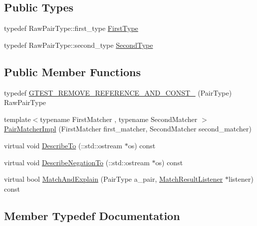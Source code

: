 \subsection*{Public Types}
\begin{DoxyCompactItemize}
\item 
typedef Raw\+Pair\+Type\+::first\+\_\+type \hyperlink{classtesting_1_1internal_1_1PairMatcherImpl_a9de66d76f0ebb0f107a9c18903b03176}{First\+Type}
\item 
typedef Raw\+Pair\+Type\+::second\+\_\+type \hyperlink{classtesting_1_1internal_1_1PairMatcherImpl_ad63c9ff4f1aff81562efca293ff5aca9}{Second\+Type}
\end{DoxyCompactItemize}
\subsection*{Public Member Functions}
\begin{DoxyCompactItemize}
\item 
typedef \hyperlink{classtesting_1_1internal_1_1PairMatcherImpl_aa035224a7b73b2af1d1d27226a479241}{G\+T\+E\+S\+T\+\_\+\+R\+E\+M\+O\+V\+E\+\_\+\+R\+E\+F\+E\+R\+E\+N\+C\+E\+\_\+\+A\+N\+D\+\_\+\+C\+O\+N\+S\+T\+\_\+} (Pair\+Type) Raw\+Pair\+Type
\item 
{\footnotesize template$<$typename First\+Matcher , typename Second\+Matcher $>$ }\\\hyperlink{classtesting_1_1internal_1_1PairMatcherImpl_ae2615e785df46255c8695a5972ca510a}{Pair\+Matcher\+Impl} (First\+Matcher first\+\_\+matcher, Second\+Matcher second\+\_\+matcher)
\item 
virtual void \hyperlink{classtesting_1_1internal_1_1PairMatcherImpl_a901ef35fe2284f9c0decf41af8143dd2}{Describe\+To} (\+::std\+::ostream $\ast$os) const 
\item 
virtual void \hyperlink{classtesting_1_1internal_1_1PairMatcherImpl_a922aa4076ef4e2f1a2d2b4ae30d8be7c}{Describe\+Negation\+To} (\+::std\+::ostream $\ast$os) const 
\item 
virtual bool \hyperlink{classtesting_1_1internal_1_1PairMatcherImpl_a691add64a7dd061451722cdf95a6eba2}{Match\+And\+Explain} (Pair\+Type a\+\_\+pair, \hyperlink{classtesting_1_1MatchResultListener}{Match\+Result\+Listener} $\ast$listener) const 
\end{DoxyCompactItemize}


\subsection{Member Typedef Documentation}
